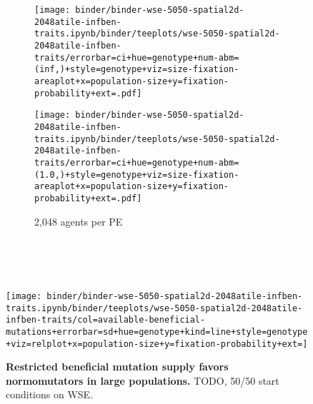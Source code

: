 \begin{figure}[h]
\begin{minipage}{0.7\textwidth}
    \begin{subfigure}[b]{\linewidth}
      \begin{minipage}{0.88\textwidth}
        \begin{minipage}{0.53\textwidth}
          \texttt{[image: binder/binder-wse-5050-spatial2d-2048atile-infben-traits.ipynb/binder/teeplots/wse-5050-spatial2d-2048atile-infben-traits/errorbar=ci+hue=genotype+num-abm=(inf,)+style=genotype+viz=size-fixation-areaplot+x=population-size+y=fixation-probability+ext=.pdf]}%
        \end{minipage}%
        \begin{minipage}{0.47\textwidth}
          \texttt{[image: binder/binder-wse-5050-spatial2d-2048atile-infben-traits.ipynb/binder/teeplots/wse-5050-spatial2d-2048atile-infben-traits/errorbar=ci+hue=genotype+num-abm=(1.0,)+style=genotype+viz=size-fixation-areaplot+x=population-size+y=fixation-probability+ext=.pdf]}
        \end{minipage}
      \end{minipage}%
      \hspace{-3ex}%
      \begin{minipage}{0.1\textwidth}
        \caption{\footnotesize 2,048 agents per PE\\~\\~\\}
        \label{fig:wse-inf-one:2048}
      \end{minipage}%
    \end{subfigure}%

~\vspace{-1.2ex}

\texttt{[image: binder/binder-wse-5050-spatial2d-2048atile-infben-traits.ipynb/binder/teeplots/wse-5050-spatial2d-2048atile-infben-traits/col=available-beneficial-mutations+errorbar=sd+hue=genotype+kind=line+style=genotype+viz=relplot+x=population-size+y=fixation-probability+ext=]}

  \end{minipage}%
  \begin{minipage}{0.3\textwidth}
    \caption{%
      \textbf{Restricted beneficial mutation supply favors normomutators in large populations.}
      \footnotesize
      TODO, 50/50 start conditions on WSE.
    }
    \label{fig:wse-inf-one}
  \end{minipage}
\end{figure}
